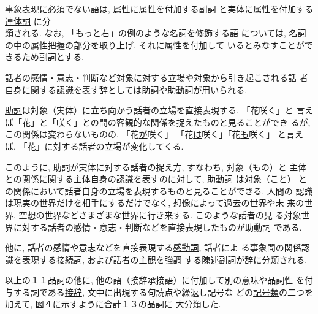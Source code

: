  事象表現に必須でない語は, 属性に属性を付加する\hspace*{-0.2mm}\underline{副詞}\hspace*{-0.1mm}
と実体に属性を付加する\hspace*{-0.2mm}\underline{連体詞}\hspace*{-0.1mm}
に分\\類される. なお, 「\underline{もっと}右」の例のような名詞を修飾する語
については, 名詞の中の属性把握の部分を取り上げ, それに属性を付加して
いるとみなすことができるため副詞とする. 

 話者の感情・意志・判断など対象に対する立場や対象から引き起こされる話
者自身に関する認識を表す辞としては助詞や助動詞が用いられる. 

 \underline{助詞}は対象（実体）に立ち向かう話者の立場を直接表現する. 
「花咲く」と
言えば「花」と「咲く」との間の客観的な関係を捉えたものと見ることができ
るが, この関係は変わらないものの, 「花\hspace*{-0.2mm}\underline{が}\hspace*{-0.1mm}咲く」
「花\hspace*{-0.2mm}\underline{は}\hspace*{-0.1mm}咲く」「花\hspace*{-0.2mm}\underline{も}\hspace*{-0.1mm}咲く」
と言えば, 「花」に対する話者の立場が変化してくる. 

 このように, 助詞が実体に対する話者の捉え方, すなわち, 対象（もの）と
主体との関係に関する主体自身の認識を表すのに対して, \underline{助動詞}
は対象（こと）
との関係において話者自身の立場を表現するものと見ることができる. 人間の
認識は現実の世界だけを相手にするだけでなく, 想像によって過去の世界や未
来の世界, 空想の世界などさまざまな世界に行き来する. このような話者の見
る対象世界に対する話者の感情・意志・判断などを直接表現したものが助動詞
である. 

 他に, 話者の感情や意志などを直接表現する\underline{感動詞}, 話者によ
る事象間の関係認識を表現する\underline{接続詞}, および話者の主観を強調
する\underline{陳述副詞}が辞に分類される.

 以上の１１品詞の他に, 他の語（接辞承接語）に付加して別の意味や品詞性
を付与する詞である\hspace*{-0.1mm}\underline{接辞}\hspace*{-0.1mm}, 文中に出現する句読点や繰返し記号な
どの\hspace*{-0.1mm}\underline{記号類}\hspace*{-0.1mm}の二つを加えて, 図４に示すように合計１３の品詞に
大分類した.

